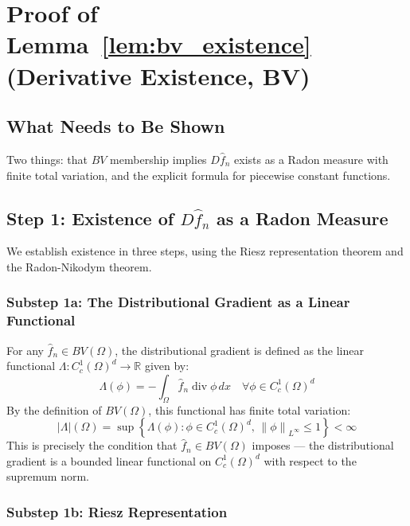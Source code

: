 \documentclass[12pt]{article}
\newcommand{\norm}[1]{\left\| #1 \right\|}
\newcommand{\R}{\mathbb{R}}
\newcommand{\BV}{BV(\Omega)}
\newcommand{\fn}{\hat{f}_n}
\begin{document}
	\section{Proof of Lemma~\ref{lem:bv_existence}
		(Derivative Existence, BV)}
	\label{app:lem_bv_existence}
	
	\subsection{What Needs to Be Shown}
	
	Two things: that $BV$ membership implies $D\fn$ exists as a Radon measure
	with finite total variation, and the explicit formula for piecewise constant
	functions.
	
	\subsection{Step 1: Existence of $D\fn$ as a Radon Measure}
	
	We establish existence in three steps, using the Riesz representation
	theorem and the Radon-Nikodym theorem.
	
	\subsubsection*{Substep 1a: The Distributional Gradient as a Linear Functional}
	
	For any $\fn \in \BV$, the distributional gradient is defined as the linear
	functional $\Lambda: C_c^1(\Omega)^d \to \R$ given by:
	\begin{equation}
		\Lambda(\phi) = -\int_\Omega \fn \operatorname{div} \phi \, dx
		\quad \forall \phi \in C_c^1(\Omega)^d
	\end{equation}
	By the definition of $\BV$, this functional has finite total variation:
	\begin{equation}
		|\Lambda|(\Omega)
		= \sup\left\{
		\Lambda(\phi) : \phi \in C_c^1(\Omega)^d,\, \norm{\phi}_{L^\infty} \leq 1
		\right\}
		< \infty
	\end{equation}
	This is precisely the condition that $\fn \in \BV$ imposes --- the
	distributional gradient is a bounded linear functional on $C_c^1(\Omega)^d$
	with respect to the supremum norm.
	
	\subsubsection*{Substep 1b: Riesz Representation}
	
\end{document}
